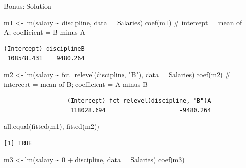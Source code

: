 \documentclass[
  ignorenonframetext,
  aspectratio=169,
]{beamer}
\newenvironment{Shaded}{\begin{snugshade}}{\end{snugshade}}
\newcommand{\AttributeTok}[1]{\textcolor[rgb]{0.40,0.45,0.13}{#1}}
\newcommand{\CommentTok}[1]{\textcolor[rgb]{0.37,0.37,0.37}{#1}}
\newcommand{\DecValTok}[1]{\textcolor[rgb]{0.68,0.00,0.00}{#1}}
\newcommand{\FunctionTok}[1]{\textcolor[rgb]{0.28,0.35,0.67}{#1}}
\newcommand{\NormalTok}[1]{\textcolor[rgb]{0.00,0.23,0.31}{#1}}
\newcommand{\OtherTok}[1]{\textcolor[rgb]{0.00,0.23,0.31}{#1}}
\newcommand{\SpecialCharTok}[1]{\textcolor[rgb]{0.37,0.37,0.37}{#1}}
\newcommand{\StringTok}[1]{\textcolor[rgb]{0.13,0.47,0.30}{#1}}
\begin{document}
\begin{frame}[fragile]{Bonus: Solution}
\protect\hypertarget{bonus-solution}{}
\begin{Shaded}
\begin{Highlighting}[]
\NormalTok{m1 }\OtherTok{\textless{}{-}} \FunctionTok{lm}\NormalTok{(salary }\SpecialCharTok{\textasciitilde{}}\NormalTok{ discipline, }\AttributeTok{data =}\NormalTok{ Salaries)}
\FunctionTok{coef}\NormalTok{(m1)    }\CommentTok{\# intercept = mean of A; coefficient = B minus A}
\end{Highlighting}
\end{Shaded}

\begin{verbatim}
(Intercept) disciplineB 
 108548.431    9480.264 
\end{verbatim}

\begin{Shaded}
\begin{Highlighting}[]
\NormalTok{m2 }\OtherTok{\textless{}{-}} \FunctionTok{lm}\NormalTok{(salary }\SpecialCharTok{\textasciitilde{}} \FunctionTok{fct\_relevel}\NormalTok{(discipline, }\StringTok{"B"}\NormalTok{), }\AttributeTok{data =}\NormalTok{ Salaries)}
\FunctionTok{coef}\NormalTok{(m2)    }\CommentTok{\# intercept = mean of B; coefficient = A minus B}
\end{Highlighting}
\end{Shaded}

\begin{verbatim}
                  (Intercept) fct_relevel(discipline, "B")A 
                   118028.694                     -9480.264 
\end{verbatim}

\begin{Shaded}
\begin{Highlighting}[]
\FunctionTok{all.equal}\NormalTok{(}\FunctionTok{fitted}\NormalTok{(m1), }\FunctionTok{fitted}\NormalTok{(m2))}
\end{Highlighting}
\end{Shaded}

\begin{verbatim}
[1] TRUE
\end{verbatim}

\begin{Shaded}
\begin{Highlighting}[]
\NormalTok{m3 }\OtherTok{\textless{}{-}} \FunctionTok{lm}\NormalTok{(salary }\SpecialCharTok{\textasciitilde{}} \DecValTok{0} \SpecialCharTok{+}\NormalTok{ discipline, }\AttributeTok{data =}\NormalTok{ Salaries)}
\FunctionTok{coef}\NormalTok{(m3)}
\end{Highlighting}
\end{Shaded}


\end{frame}
\end{document}
